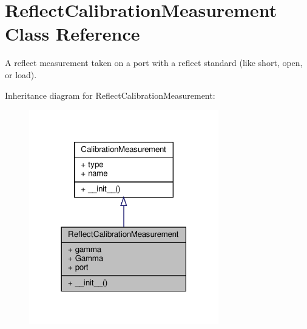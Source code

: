 \hypertarget{classSignalIntegrity_1_1Measurement_1_1Calibration_1_1CalibrationMeasurements_1_1ReflectCalibrationMeasurement}{}\section{Reflect\+Calibration\+Measurement Class Reference}
\label{classSignalIntegrity_1_1Measurement_1_1Calibration_1_1CalibrationMeasurements_1_1ReflectCalibrationMeasurement}


A reflect measurement taken on a port with a reflect standard (like short, open, or load).  




Inheritance diagram for Reflect\+Calibration\+Measurement\+:
\nopagebreak
\begin{figure}[H]
\begin{center}
\leavevmode
\includegraphics[width=234pt]{classSignalIntegrity_1_1Measurement_1_1Calibration_1_1CalibrationMeasurements_1_1ReflectCalibrationMeasurement__inherit__graph}
\end{center}
\end{figure}



